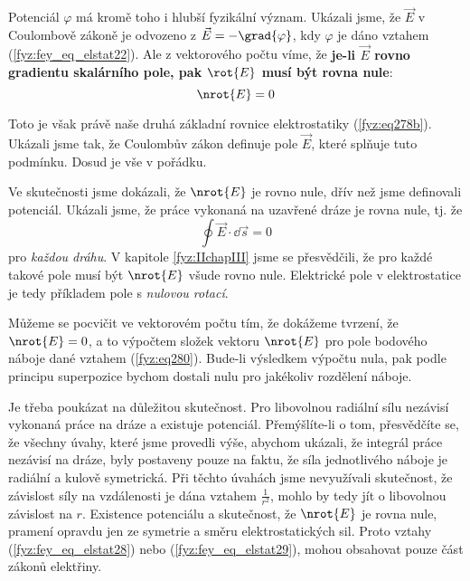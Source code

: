     Potenciál \(\varphi\) má kromě toho i hlubší fyzikální význam. Ukázali jsme, že \(\vec{E}\) v 
    Coulombově zákoně je odvozeno z \(\vec{E}= -\grad{\varphi}\), kdy \(\varphi\) je dáno vztahem 
    (\ref{fyz:fey_eq_elstat22}). Ale z vektorového počtu víme, že \textbf{je-li \(\vec{E}\) rovno 
    gradientu skalárního pole, pak \(\rot{E}\) musí být rovna nule}:
    \begin{equation}\label{fyz:fey_eq_elstat29}
     \nrot{E} = 0 
    \end{equation}
    
    Toto je však právě naše druhá základní rovnice elektrostatiky (\ref{fyz:eq278b}). 
    Ukázali jsme tak, že Coulombův zákon definuje pole \(\vec{E}\), které splňuje tuto podmínku. 
    Dosud je vše v pořádku.
    
    Ve skutečnosti jsme dokázali, že \(\nrot{E}\) je rovno nule, dřív než jsme definovali 
    potenciál. Ukázali jsme, že práce vykonaná na uzavřené dráze je rovna nule, tj. že
    \begin{equation*}
     \oint\vec{E}\cdot\dd{\vec{s}} = 0 
    \end{equation*}  
    pro \emph{každou dráhu}. V kapitole \ref{fyz:IIchapIII} jsme se přesvědčili, že pro 
    každé takové pole musí být \(\nrot{E}\) všude rovno nule. Elektrické pole v elektrostatice je 
    tedy příkladem pole s \emph{nulovou rotací}. 
    
    Můžeme se pocvičit ve vektorovém počtu tím, že dokážeme tvrzení, že \(\nrot{E}=0\), a to 
    výpočtem složek vektoru \(\nrot{E}\) pro pole bodového náboje dané vztahem 
    (\ref{fyz:eq280}). Bude-li výsledkem výpočtu nula, pak podle principu superpozice 
    bychom dostali nulu pro jakékoliv rozdělení náboje.
    
    Je třeba poukázat na důležitou skutečnost. Pro libovolnou radiální sílu nezávisí vykonaná práce 
    na dráze a existuje potenciál. Přemýšlíte-li o tom, přesvědčíte se, že všechny úvahy, které 
    jsme provedli výše, abychom ukázali, že integrál práce nezávisí na dráze, byly postaveny pouze 
    na faktu, že síla jednotlivého náboje je radiální a kulově symetrická. Při těchto úvahách jsme 
    nevyužívali skutečnost, že závislost síly na vzdálenosti je dána vztahem \(\frac{1}{r^2}\), 
    mohlo by tedy jít o libovolnou závislost na \(r\). Existence potenciálu a skutečnost, že 
    \(\nrot{E}\) je rovna nule, pramení opravdu jen ze symetrie a směru elektrostatických sil. 
    Proto vztahy (\ref{fyz:fey_eq_elstat28}) nebo (\ref{fyz:fey_eq_elstat29}), mohou obsahovat 
    pouze část zákonů elektřiny. 
 

